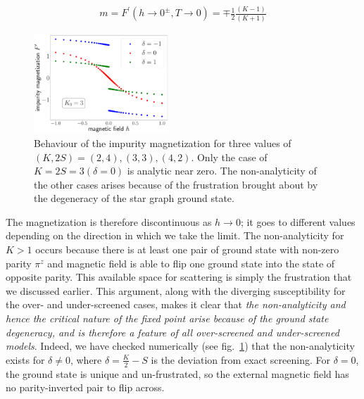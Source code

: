 \documentclass[reprint,prb,superscriptaddress]{revtex4-2}
\begin{document}
\begin{equation}\begin{aligned}
	m = F^\prime(h \to 0^\pm, T\to 0) = \mp \frac{1}{2}\frac{(K-1)}{(K+1)}
\end{aligned}\end{equation}
\begin{figure}[!htpb]
	\centering
	\includegraphics[width=0.45\textwidth]{../numerics/disc_mag_imp_gen.pdf}
	\caption{Behaviour of the impurity magnetization for three values of \(\left(K, 2S\right) = \left(2, 4\right), \left( 3,3 \right), \left(4, 2\right)  \). Only the case of \(K=2S=3 \left(\delta=0\right)\) is analytic near zero. The non-analyticity of the other cases arises because of the frustration brought about by the degeneracy of the star graph ground state.}
	\label{mag_crit}
\end{figure}

The magnetization is therefore discontinuous as \(h\to 0\); it goes to different values depending on the direction in which we take the limit. The non-analyticity for \(K>1\) occurs because there is at least one pair of ground state with non-zero parity \(\pi^z\) and magnetic field is able to flip one ground state into the state of opposite parity. This available space for scattering is simply the frustration that we discussed earlier. This argument, along with the diverging susceptibility for the over- and under-screened cases, makes it clear that \textit{the non-analyticity and hence the critical nature of the fixed point arise because of the ground state degeneracy, and is therefore a feature of all over-screened and under-screened  models}. Indeed, we have checked numerically (see fig.~\ref{mag_crit}) that the non-analyticity exists for \(\delta \neq 0\), where \(\delta = \frac{K}{2} - S\) is the deviation from exact screening. For \(\delta=0\), the ground state is unique and un-frustrated, so the external magnetic field has no parity-inverted pair to flip across.
\end{document}
